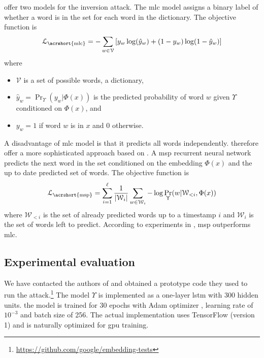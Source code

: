 			\textcite{embedding-attacks} offer two models for the inversion attack.
			The \acrfull{mlc} model assigns a binary label of whether a word is in the set for each word in the dictionary.
			The objective function is
			\[
				\mathcal{L}_{\text{\acrshort{mlc}}} = -\sum_{ w \in \mathcal{V} } \left[ y_w \log( \hat{y}_w ) + (1 - y_w) \log(1 - \hat{y}_w) \right]
			\]
			where
			\begin{itemize}
				\item $\mathcal{V}$ is a set of possible words, a dictionary,
				\item $\hat{y}_w = \Pr_\Upsilon( y_w | \Phi( x ) )$ is the predicted probability of word $w$ given $\Upsilon$ conditioned on $\Phi( x )$, and
				\item $y_w = 1$ if word $w$ is in $x$ and 0 otherwise.
			\end{itemize}

			A disadvantage of \acrshort{mlc} model is that it predicts all words independently.
			\textcite{embedding-attacks} therefore offer a more sophisticated approach based on \cite{msp}.
			A \acrfull{msp} recurrent neural network predicts the next word in the set conditioned on the embedding $\Phi( x )$ and the up to date predicted set of words.
			The objective function is
			\[
				\mathcal{L}_{\text{\acrshort{msp}}} = \sum_{ i = 1 }^\ell \frac{1}{| \mathcal{W}_i |} \sum_{w \in \mathcal{W}_i } - \log \Pr_\Upsilon( w | \mathcal{W}_{ < i }, \Phi( x ) )
			\]
			where $\mathcal{W}_{ < i }$ is the set of already predicted words up to a timestamp $i$ and $\mathcal{W}_i$ is the set of words left to predict.
			According to experiments in \cite{embedding-attacks}, \acrshort{msp} outperforms \acrshort{mlc}.

		\subsection{Experimental evaluation}\label{section:knn-snapshot:attacks:experiments}

			We have contacted the authors of \cite{embedding-attacks} and obtained a prototype code they used to run the attack.\footnote{
				\url{https://github.com/google/embedding-tests}
			}
			The model $\Upsilon$ is implemented as a one-layer \acrshort{lstm} with \num{300} hidden units.
			the model is trained for 30 epochs with Adam optimizer \cite{adam-optimizer}, learning rate of $10^{-3}$ and batch size of 256.
			The actual implementation uses TensorFlow \cite{tensorflow} (version 1) and is naturally optimized for \acrshort{gpu} training.

